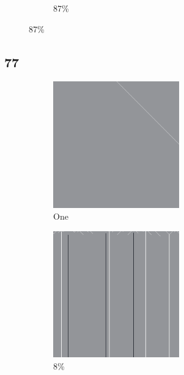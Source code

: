\documentclass[12pt, fleqn]{report}                             %
\theoremstyle{break}                                            %
\begin{document}
\begin{figure}[ht!]
\begin{subfigure}[b]{0.4\linewidth}
          \caption{87\%}
        \end{subfigure}
      \end{figure}


      \clearpage
      \subsection{77}
      \begin{figure}[ht!]
        \centering
        \begin{subfigure}[b]{0.4\linewidth}
          \includegraphics[width=0.6\textwidth]{Images/77/a.png}
          \caption{One}
        \end{subfigure}
        \begin{subfigure}[b]{0.4\linewidth}
          \includegraphics[width=0.6\textwidth]{Images/77/b.png}
          \caption{8\%}
        \end{subfigure}
        \begin{subfigure}[b]{0.4\linewidth}

\end{subfigure}
\end{figure}
\end{document}
